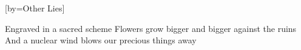 [by={Other Lies}]

  \chordsoff
  \beginverse
  Engraved in a sacred scheme
  Flowers grow bigger and bigger against the ruins
  And a nuclear wind blows our precious things away
  \endverse
\endsong
